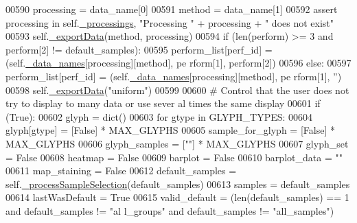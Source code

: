\begin{DoxyCode}
00590             processing = data\_name[0]
00591             method = data\_name[1]
00592             \textcolor{keyword}{assert} processing \textcolor{keywordflow}{in} self.\hyperlink{classnavicom_1_1navicom_1_1NaviCom_ac6a14d6a91cd2f236eef71496a6f249c}{_processings}, \textcolor{stringliteral}{"Processing "} + processing + 
      \textcolor{stringliteral}{" does not exist"}
00593             self.\hyperlink{classnavicom_1_1navicom_1_1NaviCom_afb8ef6988c65589c35ad11dcb8681787}{_exportData}(method, processing)
00594             \textcolor{keywordflow}{if} (len(perform) >= 3 \textcolor{keywordflow}{and} perform[2] != default\_samples):
00595                 perform\_list[perf\_id] = (self.\hyperlink{classnavicom_1_1navicom_1_1NaviCom_ab8c34ab1a6d2a23f9b9ecee65375317a}{_data_names}[processing][method], pe
      rform[1], perform[2])
00596             \textcolor{keywordflow}{else}:
00597                 perform\_list[perf\_id] = (self.\hyperlink{classnavicom_1_1navicom_1_1NaviCom_ab8c34ab1a6d2a23f9b9ecee65375317a}{_data_names}[processing][method], pe
      rform[1], \textcolor{stringliteral}{''})
00598         self.\hyperlink{classnavicom_1_1navicom_1_1NaviCom_afb8ef6988c65589c35ad11dcb8681787}{_exportData}(\textcolor{stringliteral}{"uniform"})
00599 
00600         \textcolor{comment}{# Control that the user does not try to display to many data or use sever
      al times the same display}
00601         \textcolor{keywordflow}{if} (\textcolor{keyword}{True}):
00602             glyph = dict()
00603             \textcolor{keywordflow}{for} gtype \textcolor{keywordflow}{in} GLYPH\_TYPES:
00604                 glyph[gtype] = [\textcolor{keyword}{False}] * MAX\_GLYPHS
00605             sample\_for\_glyph = [\textcolor{keyword}{False}] * MAX\_GLYPHS
00606             glyph\_samples = [\textcolor{stringliteral}{""}] * MAX\_GLYPHS
00607             glyph\_set = \textcolor{keyword}{False}
00608             heatmap = \textcolor{keyword}{False}
00609             barplot = \textcolor{keyword}{False}
00610             barplot\_data = \textcolor{stringliteral}{""}
00611             map\_staining = \textcolor{keyword}{False}
00612             default\_samples = self.\hyperlink{classnavicom_1_1navicom_1_1NaviCom_a2acd087f6c61dc8c7e1bc5a3391ff982}{_processSampleSelection}(default\_samples)
00613             samples = default\_samples
00614             lastWasDefault = \textcolor{keyword}{True}
00615             valid\_default = (len(default\_samples) == 1 \textcolor{keywordflow}{and} default\_samples != \textcolor{stringliteral}{"al
      l\_groups"} \textcolor{keywordflow}{and} default\_samples != \textcolor{stringliteral}{"all\_samples"})

\end{DoxyCode}
